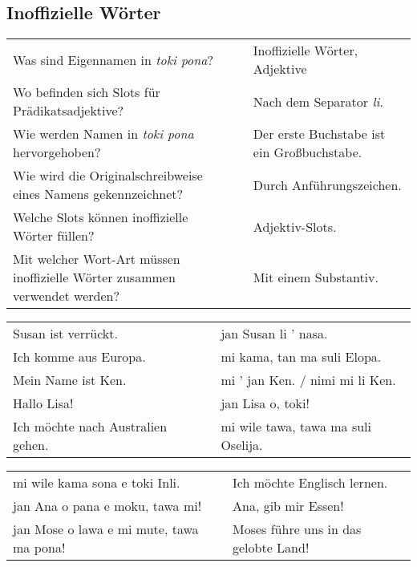 \newpage
%
\subsection*{Inoffizielle Wörter} 
\label{'unofficial_words'}

\begin{supertabular}{p{5,5cm}|ll}
Was sind Eigennamen in \textit{toki pona}? && Inoffizielle Wörter, Adjektive \\ %
Wo befinden sich Slots für Prädikatsadjektive? && Nach dem Separator \textit{li}. \\ %
Wie werden Namen in \textit{toki pona} hervorgehoben? && Der erste Buchstabe ist ein Großbuchstabe. \\ %
Wie wird die Originalschreibweise eines Namens gekennzeichnet? && Durch Anführungszeichen.  \\ %
Welche Slots können inoffizielle Wörter füllen? && Adjektiv-Slots.  \\ %
Mit welcher Wort-Art müssen inoffizielle Wörter zusammen verwendet werden? && Mit einem Substantiv. \\ %
\end{supertabular}

\begin{supertabular}{p{5,5cm}|ll}
Susan ist verrückt.   && jan Susan li ' nasa. \\ %
Ich komme aus Europa.  && mi kama, tan ma suli Elopa. \\ %
Mein Name ist Ken.  && mi ' jan Ken. / nimi mi li Ken. \\ %
Hallo Lisa!  && jan Lisa o, toki! \\ %
Ich möchte nach Australien gehen.  && mi wile tawa, tawa ma suli Oselija. \\  %
\end{supertabular}  

\begin{supertabular}{p{5,5cm}|ll}
mi wile kama sona e toki Inli.  && Ich möchte Englisch lernen. \\
jan Ana o pana e moku, tawa mi!  && Ana, gib mir Essen! \\
jan Mose o lawa e mi mute, tawa ma pona!  && Moses führe uns in das gelobte Land! \\
\end{supertabular} 


